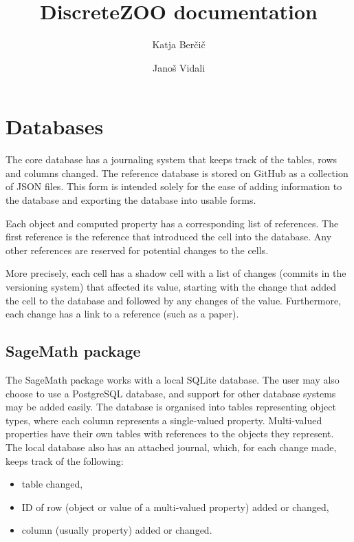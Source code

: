 \documentclass[12pt,a4paper]{article}
\begin{document}
\title{DiscreteZOO documentation}
\author{Katja Ber\v{c}i\v{c} \and  Jano\v{s} Vidali}
\maketitle

\section{Databases}

The core database has a journaling system
that keeps track of the tables, rows and columns changed.
The reference database is stored on GitHub as a collection of JSON files.
This form is intended solely
for the ease of adding information to the database
and exporting the database into usable forms.

Each object and computed property has a corresponding list of references.
The first reference is the reference
that introduced the cell into the database.
Any other references are reserved for potential changes to the cells.

More precisely, each cell has a shadow cell with a list of changes
(commits in the versioning system)
that affected its value,
starting with the change that added the cell to the database
and followed by any changes of the value.
Furthermore, each change has a link to a reference (such as a paper).

\subsection{SageMath package}

The SageMath package works with a local SQLite database.
The user may also choose to use a PostgreSQL database,
and support for other database systems may be added easily.
The database is organised into tables representing object types,
where each column represents a single-valued property.
Multi-valued properties have their own tables
with references to the objects they represent.
The local database also has an attached journal,
which, for each change made, keeps track of the following:
\begin{itemize}
\item table changed,
\item ID of row (object or value of a multi-valued property) added or changed,
\item column (usually property) added or changed.
\end{itemize}
\end{document}
